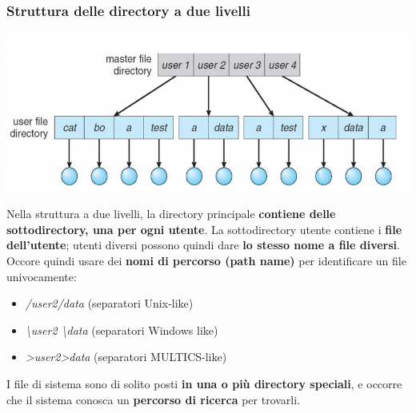 \documentclass[12pt]{article}
\begin{document}
\subsubsection{Struttura delle directory a due livelli}
\begin{center}
    \includegraphics[width = 0.70\linewidth]{Images/26.png}
\end{center}
Nella struttura a due livelli, la directory principale \textbf{contiene delle sottodirectory, una per ogni utente}.
La sottodirectory utente contiene i \textbf{file dell'utente}; utenti diversi possono quindi dare \textbf{lo stesso nome a file diversi}.
Occore quindi usare dei \textbf{nomi di percorso (path name)} per identificare un file univocamente:
\begin{itemize}
    \item \textit{/user2/data} (separatori Unix-like)
    \item \textit{\textbackslash user2 \textbackslash data} (separatori Windows like)
    \item \textit{>user2>data} (separatori MULTICS-like)
\end{itemize}
I file di sistema sono di solito posti \textbf{in una o più directory speciali}, e occorre che il sistema conosca un \textbf{percorso di ricerca} per trovarli.
\end{document}
